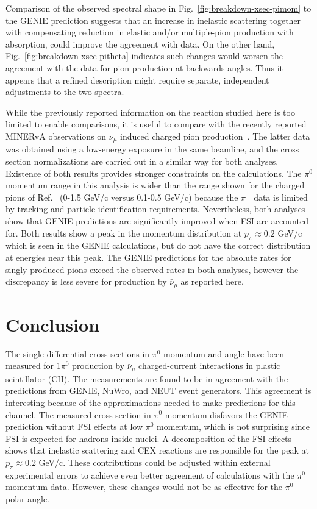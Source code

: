 Comparison of the observed spectral shape in Fig.~\ref{fig:breakdown-xsec-pimom} to the GENIE prediction suggests
that an increase in inelastic scattering together with compensating reduction in elastic 
and/or multiple-pion production with absorption, could improve the agreement with data.
On the other hand,  Fig.~\ref{fig:breakdown-xsec-pitheta} indicates such changes would worsen the agreement with 
the data  for pion production at backwards angles.  Thus it appears that a refined 
description might require separate, independent adjustments to the two spectra.

While the previously reported information on the reaction studied here is too limited to 
enable comparisons, it is useful to compare with the recently reported MINERvA observations 
on $\nu_\mu$ induced charged pion production~\cite{Eberly:2014mra}. The latter data was obtained using a 
low-energy exposure in the same beamline, and the cross section normalizations are carried out 
in a similar way for both analyses.  Existence of both results provides stronger
constraints on the calculations. 
The $\pi^0$ momentum range in this analysis
is wider than the range shown for the charged pions of Ref.~\cite{Eberly:2014mra} (0-1.5 GeV/c versus 0.1-0.5 GeV/c) 
because the $\pi^+$ data is limited by tracking and particle identification requirements. 
Nevertheless, both analyses show that GENIE predictions are significantly improved when FSI are accounted for.   
Both results show a peak in the momentum distribution at $p_\pi \approx 0.2$ GeV/c which is seen in the GENIE calculations, 
but do not have the correct distribution at energies near this peak.
The GENIE predictions for the absolute rates for singly-produced pions exceed the observed 
rates in both analyses, however the discrepancy is less severe for production by
$\bar{\nu}_\mu$ as reported here.


\section{Conclusion}

The single differential cross sections in $\pi^0$ momentum 
and angle have been measured for 1$\pi^0$ production by $\bar{\nu}_\mu$ charged-current 
interactions in plastic scintillator (CH). 
The measurements are found to be in agreement with the predictions from 
GENIE, NuWro, and NEUT event generators. This agreement is interesting because of 
the approximations needed to make predictions
for this channel.  The measured cross section in $\pi^0$ momentum disfavors 
the GENIE prediction without FSI effects at low $\pi^0$ momentum, which is not surprising 
since FSI is expected for hadrons inside nuclei. A decomposition 
of the FSI effects shows that inelastic scattering and CEX reactions
are responsible for the peak at $p_\pi\approx 0.2$ GeV/c. These contributions
could be adjusted within external experimental errors to achieve
even better agreement of calculations with the $\pi^0$ momentum data.
However, these changes would not be as effective for the $\pi^0$ polar angle. 

